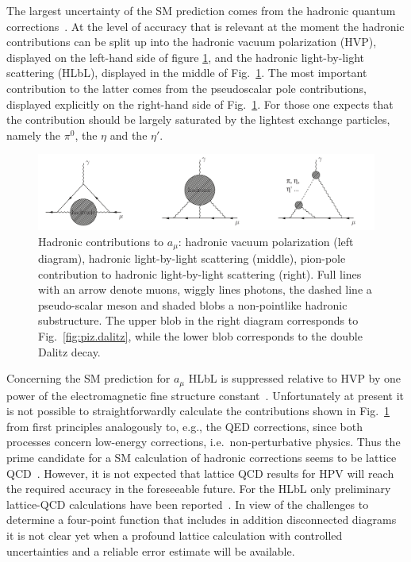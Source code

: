 \documentclass[11pt,a4paper,twocolumn]{article}
\begin{document}
The largest uncertainty of the SM prediction comes from
the hadronic quantum corrections~\cite{Jegerlehner:2009ry}.
At the level of accuracy that is relevant at the moment the hadronic
contributions can be split up into the hadronic vacuum polarization
(HVP), displayed on the left-hand side of figure \ref{fig:gm2}, and the
hadronic light-by-light scattering (HLbL), displayed in the middle of
Fig.~\ref{fig:gm2}. The most important contribution to the latter
comes from the pseudoscalar pole contributions, displayed explicitly on the right-hand 
side of Fig.~\ref{fig:gm2}. For those one expects that the contribution
should be largely saturated by the lightest exchange particles, namely the 
$\pi^0$, the $\eta$ and the $\eta'$. 
%
\begin{figure}[!h]
	\includegraphics[keepaspectratio,width=1.\textwidth]{figures/hadronicgm2.pdf}
	\caption{Hadronic contributions to $a_\mu$: hadronic vacuum polarization (left diagram), 
		hadronic light-by-light scattering (middle), pion-pole contribution to hadronic light-by-light scattering (right). Full lines with an arrow denote muons, wiggly lines photons, the dashed line a pseudo-scalar meson and shaded blobs a non-pointlike hadronic substructure. The upper blob in the right diagram corresponds to Fig.~\ref{fig:piz.dalitz}, while the lower blob corresponds to the double Dalitz decay. 
	}
	\label{fig:gm2}
\end{figure}

Concerning the SM prediction for $a_\mu$ HLbL is suppressed relative to HVP by one power of the electromagnetic
fine structure constant~\cite{Jegerlehner:2009ry,Bijnens:2007pz}.  
Unfortunately at present it is not possible to straightforwardly 
calculate the contributions shown in Fig.~\ref{fig:gm2} 
from first principles analogously to, e.g., the QED corrections, since
both processes concern low-energy corrections,
i.e.\ non-perturbative physics. Thus the prime candidate for a SM
calculation of hadronic corrections seems to be lattice QCD~\cite{Gattringer:2010zz}. 
However, it is not expected that lattice QCD
results for HPV will reach the required accuracy in the foreseeable future.
For the HLbL only preliminary lattice-QCD calculations have been reported~\cite{Blum:2014oka}.  
In view of the challenges to determine
a four-point function that includes in addition disconnected diagrams
it is not clear yet when a profound lattice calculation with
controlled uncertainties and a reliable error estimate will be
available.
\end{document}
